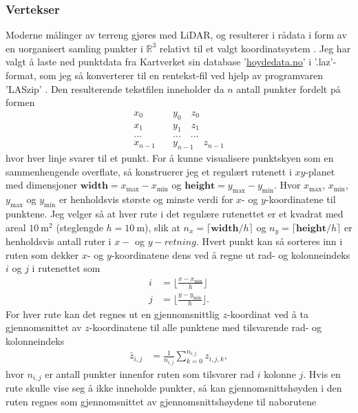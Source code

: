 \documentclass[norsk, doc, 12pt, a4paper]{apa7}  %
\newcommand{\R}{\mathbb{R}}
\begin{document}
\subsubsection{Vertekser} \label{M:1:1}
Moderne målinger av terreng gjøres med LiDAR, og resulterer i rådata i form av en uorganisert samling punkter i \(\R^{3}\) relativt til et valgt koordinatsystem \parencite{bergerSurveySurfaceReconstruction2017}. Jeg har valgt å laste ned punktdata fra Kartverket sin database '\url{hoydedata.no}' i '.laz'-format, som jeg så konverterer til en rentekst-fil ved hjelp av programvaren 'LASzip' \parencite{isenburgLASzip2019}. Den resulterende tekstfilen inneholder da \(n\) antall punkter fordelt på formen
\begin{align*}
 x_{0} \quad &y_{0} \quad z_{0} \\
 x_{1} \quad &y_{1} \quad z_{1} \\
 ... \quad &... \quad ... \\
 x_{n-1} \quad &y_{n-1} \quad z_{n-1}
\end{align*}
hvor hver linje svarer til et punkt. For å kunne visualisere punktskyen som en sammenhengende overflate, så konstruerer jeg et regulært rutenett i \(xy\)-planet med dimensjoner \(\textbf{width} = x_{\text{max}} - x_{\text{min}}\) og \(\textbf{height} = y_{\text{max}} - y_{\text{min}}\). Hvor \(x_{\text{max}}\), \(x_{\text{min}}\), \(y_{\text{max}}\) og \(y_{\text{min}}\) er henholdsvis største og minste verdi for \(x\)- og \(y\)-koordinatene til punktene. Jeg velger så at hver rute i det regulære rutenettet er et kvadrat med areal \(\SI{10}{\metre\squared}\) (steglengde \(h = \SI{10}{\metre}\)), slik at \(n_{x} = \lceil \textbf{width}/h \rceil\) og \(n_{y} = \lceil \textbf{height}/h \rceil\) er henholdsvis antall ruter i \(x-\) og \(y-retning\). Hvert punkt kan så sorteres inn i ruten som dekker \(x\)- og \(y\)-koordinatene dens ved å regne ut rad- og kolonneindeks \(i\) og \(j\) i rutenettet som
\begin{align*}
	i &= \lfloor \frac{x - x_{\text{min}}}{h} \rfloor \\
	j &= \lfloor \frac{y - y_{\text{min}}}{h} \rfloor.
\end{align*}
For hver rute kan det regnes ut en gjennomsnittlig \(z\)-koordinat ved å ta gjennomsnittet av \(z\)-koordinatene til alle punktene med tilsvarende rad- og kolonneindeks
\begin{align*}
	\bar{z}_{i,j} &= \frac{1}{n_{i,j}}\sum_{k = 0}^{n_{i,j}}z_{i,j,k},
\end{align*}
hvor \(n_{i,j}\) er antall punkter innenfor ruten som tilsvarer rad \(i\) kolonne \(j\). Hvis en rute skulle vise seg å ikke inneholde punkter, så kan gjennomsnittshøyden i den ruten regnes som gjennomsnittet av gjennomsnittshøydene til naborutene
\end{document}
